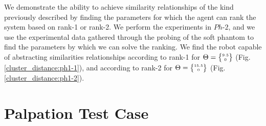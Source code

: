 We demonstrate the ability to achieve similarity relationships of the kind previously described by 
finding the parameters for which the agent can rank the system based on rank-1 or rank-2. We perform 
the experiments in $Ph\text{-}2$, and we use the experimental data gathered through the probing of the soft 
phantom to find the parameters by which we can solve the ranking. We find the robot capable of 
abstracting similarities relationships according to rank-1 for $\Theta = \tiny{\begin{Bmatrix}9.5\\ 0\end{Bmatrix}}$ (Fig. \ref{cluster_distance:ph1-1}), and according to rank-2 for $\Theta = \tiny{\begin{Bmatrix}15.5\\ 0\end{Bmatrix}}$ (Fig. \ref{cluster_distance:ph1-2}).


\section{Palpation Test Case} \label{sec_test_case}

